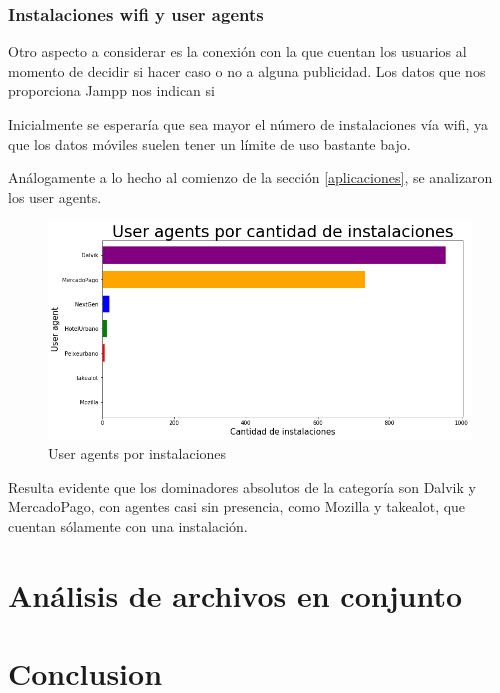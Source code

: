 \documentclass[a4paper, 12pt]{article}
\begin{document}
	\subsubsection{Instalaciones wifi y user agents}
	
		Otro aspecto a considerar es la conexión con la que cuentan los usuarios al momento de decidir si hacer caso o no a alguna publicidad. Los datos que nos proporciona Jampp nos indican si 
		
		
		
		Inicialmente se esperaría que sea mayor el número de instalaciones vía wifi, ya que los datos móviles suelen tener un límite de uso bastante bajo.
		
		
		
		
		
		
		
		
		Análogamente a lo hecho al comienzo de la sección \ref{aplicaciones}, se analizaron los user agents.
		
		\FloatBarrier
		\begin{figure}[h]
			\centering
			\includegraphics[width=\textwidth]{images/installs/useragents.png}
			\caption{User agents por instalaciones}
		\end{figure}
		\FloatBarrier
		
		Resulta evidente que los dominadores absolutos de la categoría son Dalvik y MercadoPago, con agentes casi sin presencia, como Mozilla y takealot, que cuentan sólamente con una instalación.
\section{Análisis de archivos en conjunto}

\section{Conclusion}




\end{document}
